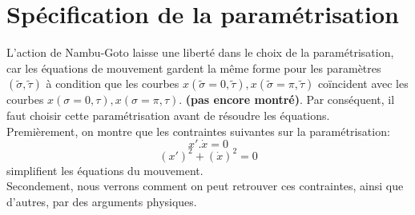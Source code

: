 \documentclass[a4paper,12pt]{article}
\begin{document}
\section{Spécification de la paramétrisation}
L'action de Nambu-Goto laisse une liberté dans le choix de la paramétrisation, car les équations de mouvement gardent la même forme pour les paramètres $(\tilde{\sigma},\tilde{\tau})$ à condition que les courbes $x(\tilde{\sigma}=0,\tilde{\tau}), x(\tilde{\sigma}=\pi,\tilde{\tau})$ coïncident avec les courbes $x(\sigma=0,\tau), x(\sigma=\pi,\tau)$. \textbf{(pas encore montré)}.
Par conséquent, il faut choisir cette paramétrisation avant de résoudre les équations.\\
Premièrement, on montre que les contraintes suivantes sur la paramétrisation:
\begin{equation}
x'. \dot{x}=0
\end{equation}
\begin{equation}
\left( x'\right) ^{2}+\left(\dot{x}\right) ^{2}=0 
\end{equation}
simplifient les équations du mouvement.\\ Secondement, nous verrons comment on peut retrouver ces contraintes, ainsi que d'autres, par des arguments physiques. 
\end{document}
